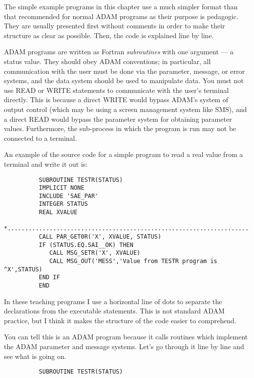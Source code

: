 The simple example programs in this chapter use a much simpler format than that
recommended for normal ADAM programs as their purpose is pedagogic.
They are usually presented first without comments in order to make their
structure as clear as possible.
Then, the code is explained line by line.

ADAM programs are written as Fortran {\em subroutines} with one argument --- a
status value.
They should obey ADAM conventions; in particular, all communication
with the user must be done via the parameter, message, or error systems, and
the data system should be used to manipulate data.
You must not use READ or WRITE statements to communicate with the user's
terminal directly.
This is because a direct WRITE would bypass ADAM's system of output control
(which may be using a screen management system like SMS), and a direct READ
would bypass the parameter system for obtaining parameter values.
Furthermore, the sub-process in which the program is run may not be connected to
a terminal.

An example of the source code for a simple program to read a real value from a
terminal and write it out is:

\begin{small}
\begin{verbatim}
          SUBROUTINE TESTR(STATUS)
          IMPLICIT NONE
          INCLUDE 'SAE_PAR'
          INTEGER STATUS
          REAL XVALUE
    *...........................................................................
          CALL PAR_GET0R('X', XVALUE, STATUS)
          IF (STATUS.EQ.SAI__OK) THEN
             CALL MSG_SETR('X', XVALUE)
             CALL MSG_OUT('MESS','Value from TESTR program is ^X',STATUS)
          END IF
          END
\end{verbatim}
\end{small}

In these teaching programs I use a horizontal line of dots to separate the
declarations from the executable statements.
This is not standard ADAM practice, but I think it makes the structure of the
code easier to comprehend.

You can tell this is an ADAM program because it calls routines which implement
the ADAM parameter and message systems.
Let's go through it line by line and see what is going on.

\begin{small}
\begin{verbatim}
          SUBROUTINE TESTR(STATUS)
\end{verbatim}
\end{small}

